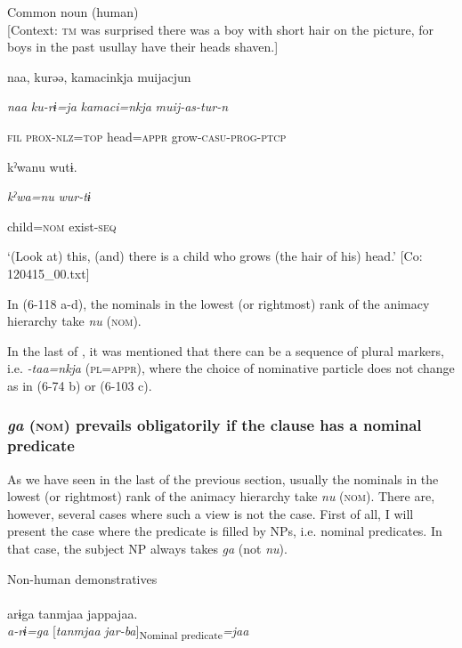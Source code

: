  \ex Common noun (human)\\{}
[Context: \textsc{tm} was surprised there was a boy with short hair on the picture, for boys in the past usullay have their heads shaven.]

{\TM}
\gll naa,  kurəə,  kamacinkja  muijacjun

      \textit{naa}  \textit{ku-rɨ=ja}  \textit{kamaci=nkja}  \textit{muij-as-tur-n}

      \textsc{fil}  \textsc{prox}-\textsc{nlz}=\textsc{top}  head=\textsc{appr}  grow-\textsc{casu}-\textsc{prog}-\textsc{ptcp}

      kˀwanu  wutɨ.

      \textit{kˀwa=nu}  \textit{wur-tɨ}

      child=\textsc{nom}  exist-\textsc{seq}

\glt ‘(Look at) this, (and) there is a child who grows (the hair of his) head.’ [Co: 120415\_00.txt]
\z

In (6-118 a-d), the nominals in the lowest (or rightmost) rank of the animacy hierarchy take \textit{nu} (\textsc{nom}).

  In the last of , it was mentioned that there can be a sequence of plural markers, i.e. \textit{{}-taa=nkja} (\textsc{pl}=\textsc{appr}), where the choice of nominative particle does not change as in (6-74 b) or (6-103 c).

\subsubsection{\textit{ga} (\textsc{nom}) prevails obligatorily if the clause has a nominal predicate}

As we have seen in the last of the previous section, usually the nominals in the lowest (or rightmost) rank of the animacy hierarchy take \textit{nu} (\textsc{nom}). There are, however, several cases where such a view is not the case. First of all, I will present the case where the predicate is filled by NPs, i.e. nominal predicates. In that case, the subject NP always takes \textit{ga} (not \textit{nu}).

\ea\label{ex:6-119}
 Non-human demonstratives\\

 \ea{}\\
\gll  {\TM}  arɨga  tanmjaa  jappajaa.\\

      \textit{a-rɨ=ga}  [\textit{tanmjaa}  \textit{jar-ba}]\textsubscript{Nominal predicate}\textit{=jaa}

